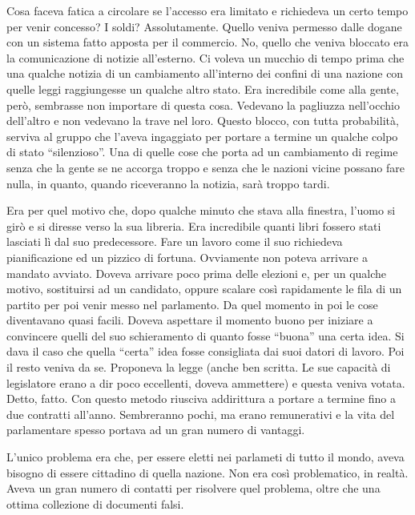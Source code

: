     Cosa faceva fatica a circolare se l'accesso era limitato e richiedeva
    un certo tempo per venir concesso? I soldi? Assolutamente. Quello
    veniva permesso dalle dogane con un sistema fatto apposta per il
    commercio. No, quello che veniva bloccato era la comunicazione di
    notizie all'esterno. Ci voleva un mucchio di tempo prima che una
    qualche notizia di un cambiamento all'interno dei confini di una
    nazione con quelle leggi raggiungesse un qualche altro stato. Era
    incredibile come alla gente, però, sembrasse non importare di questa
    cosa. Vedevano la pagliuzza nell'occhio dell'altro e non vedevano la
    trave nel loro. Questo blocco, con tutta probabilità, serviva al gruppo
    che l'aveva ingaggiato per portare a termine un qualche colpo di stato
    ``silenzioso''. Una di quelle cose che porta ad un cambiamento di
    regime senza che la gente se ne accorga troppo e senza che le nazioni
    vicine possano fare nulla, in quanto, quando riceveranno la notizia,
    sarà troppo tardi.

    Era per quel motivo che, dopo qualche minuto che stava alla finestra,
    l'uomo si girò e si diresse verso la sua libreria. Era incredibile
    quanti libri fossero stati lasciati lì dal suo predecessore. Fare un
    lavoro come il suo richiedeva pianificazione ed un pizzico di fortuna.
    Ovviamente non poteva arrivare a mandato avviato. Doveva arrivare
    poco prima delle elezioni e, per un qualche motivo, sostituirsi ad un
    candidato, oppure scalare così rapidamente le fila di un partito per
    poi venir messo nel parlamento. Da quel momento in poi le cose
    diventavano quasi facili. Doveva aspettare il momento buono per
    iniziare a convincere quelli del suo schieramento di quanto fosse
    ``buona'' una certa idea. Si dava il caso che quella ``certa'' idea
    fosse consigliata dai suoi datori di lavoro. Poi il resto veniva da se.
    Proponeva la legge (anche ben scritta. Le sue capacità di legislatore
    erano a dir poco eccellenti, doveva ammettere) e questa veniva votata.
    Detto, fatto. Con questo metodo riusciva addirittura a portare a
    termine fino a due contratti all'anno. Sembreranno pochi, ma erano
    remunerativi e la vita del parlamentare spesso portava ad un gran
    numero di vantaggi.

    L'unico problema era che, per essere eletti nei parlameti di tutto il
    mondo, aveva bisogno di essere cittadino di quella nazione. Non era
    così problematico, in realtà. Aveva un gran numero di contatti per
    risolvere quel problema, oltre che una ottima collezione di documenti
    falsi.

